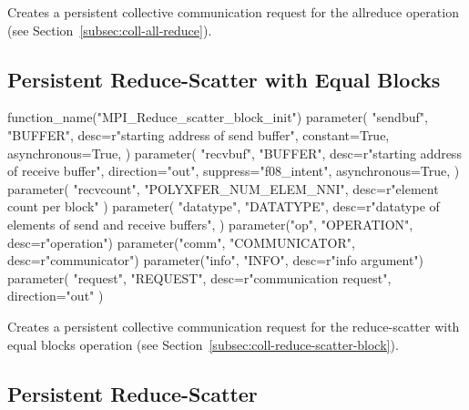 Creates a persistent collective communication request for the allreduce operation
(see Section~\ref{subsec:coll-all-reduce}).

\subsection{Persistent Reduce-Scatter with Equal Blocks}
\label{sec:pcoll-reduce-scatter-block}

%
\begin{mpi-binding}
    function_name("MPI_Reduce_scatter_block_init")
    parameter(
        "sendbuf",
        "BUFFER",
        desc=r"starting address of send buffer",
        constant=True,
        asynchronous=True,
    )
    parameter(
        "recvbuf",
        "BUFFER",
        desc=r"starting address of receive buffer",
        direction="out",
        suppress="f08_intent",
        asynchronous=True,
    )
    parameter(
        "recvcount", "POLYXFER_NUM_ELEM_NNI", desc=r"element count per block"
    )
    parameter(
        "datatype",
        "DATATYPE",
        desc=r"datatype of elements of send and receive buffers",
    )
    parameter("op", "OPERATION", desc=r"operation")
    parameter("comm", "COMMUNICATOR", desc=r"communicator")
    parameter("info", "INFO", desc=r"info argument")
    parameter(
        "request", "REQUEST", desc=r"communication request", direction="out"
    )
\end{mpi-binding}

Creates a persistent collective communication request for the reduce-scatter
with equal blocks operation (see Section~\ref{subsec:coll-reduce-scatter-block}).


\subsection{Persistent Reduce-Scatter}
\label{sec:pcoll-reduce-scatter}

